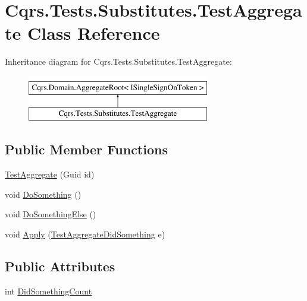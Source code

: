 \hypertarget{classCqrs_1_1Tests_1_1Substitutes_1_1TestAggregate}{}\section{Cqrs.\+Tests.\+Substitutes.\+Test\+Aggregate Class Reference}
\label{classCqrs_1_1Tests_1_1Substitutes_1_1TestAggregate}
Inheritance diagram for Cqrs.\+Tests.\+Substitutes.\+Test\+Aggregate\+:\begin{figure}[H]
\begin{center}
\leavevmode
\includegraphics[height=2.000000cm]{classCqrs_1_1Tests_1_1Substitutes_1_1TestAggregate}
\end{center}
\end{figure}
\subsection*{Public Member Functions}
\begin{DoxyCompactItemize}
\item 
\hyperlink{classCqrs_1_1Tests_1_1Substitutes_1_1TestAggregate_a037a8183b69a72695e4dc35b1ba128ca}{Test\+Aggregate} (Guid id)
\item 
void \hyperlink{classCqrs_1_1Tests_1_1Substitutes_1_1TestAggregate_acb912c64b9ed2184e998448ab5fe524b}{Do\+Something} ()
\item 
void \hyperlink{classCqrs_1_1Tests_1_1Substitutes_1_1TestAggregate_a402ed6555ed4e80deb4cdccfd8d3bde8}{Do\+Something\+Else} ()
\item 
void \hyperlink{classCqrs_1_1Tests_1_1Substitutes_1_1TestAggregate_a32df0d885ad650dac9b815168f6a390e}{Apply} (\hyperlink{classCqrs_1_1Tests_1_1Substitutes_1_1TestAggregateDidSomething}{Test\+Aggregate\+Did\+Something} e)
\end{DoxyCompactItemize}
\subsection*{Public Attributes}
\begin{DoxyCompactItemize}
\item 
int \hyperlink{classCqrs_1_1Tests_1_1Substitutes_1_1TestAggregate_a589a358905081830d8be4b5c118d0e8b}{Did\+Something\+Count}
\end{DoxyCompactItemize}
